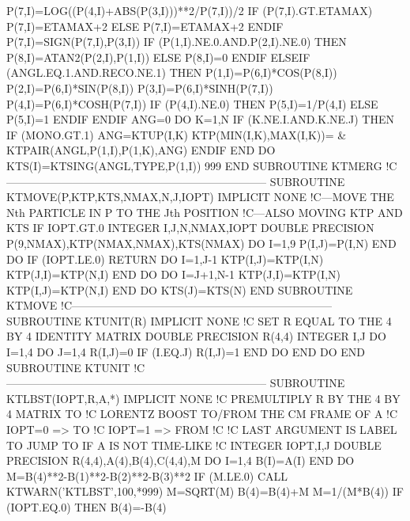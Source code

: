             P(7,I)=LOG((P(4,I)+ABS(P(3,I)))**2/P(7,I))/2
            IF (P(7,I).GT.ETAMAX) P(7,I)=ETAMAX+2
         ELSE
            P(7,I)=ETAMAX+2
         ENDIF
         P(7,I)=SIGN(P(7,I),P(3,I))
         IF (P(1,I).NE.0.AND.P(2,I).NE.0) THEN
            P(8,I)=ATAN2(P(2,I),P(1,I))
         ELSE
            P(8,I)=0
         ENDIF
      ELSEIF (ANGL.EQ.1.AND.RECO.NE.1) THEN
         P(1,I)=P(6,I)*COS(P(8,I))
         P(2,I)=P(6,I)*SIN(P(8,I))
         P(3,I)=P(6,I)*SINH(P(7,I))
         P(4,I)=P(6,I)*COSH(P(7,I))
         IF (P(4,I).NE.0) THEN
            P(5,I)=1/P(4,I)
         ELSE
            P(5,I)=1
         ENDIF
      ENDIF
      ANG=0
      DO K=1,N
         IF (K.NE.I.AND.K.NE.J) THEN
            IF (MONO.GT.1) ANG=KTUP(I,K)
            KTP(MIN(I,K),MAX(I,K))= &
                 KTPAIR(ANGL,P(1,I),P(1,K),ANG)
         ENDIF
      END DO
      KTS(I)=KTSING(ANGL,TYPE,P(1,I))
999 END SUBROUTINE KTMERG
!C-----------------------------------------------------------------------
    SUBROUTINE KTMOVE(P,KTP,KTS,NMAX,N,J,IOPT)
      IMPLICIT NONE
!C---MOVE THE Nth PARTICLE IN P TO THE Jth POSITION
!C---ALSO MOVING KTP AND KTS IF IOPT.GT.0
      INTEGER I,J,N,NMAX,IOPT
      DOUBLE PRECISION P(9,NMAX),KTP(NMAX,NMAX),KTS(NMAX)
      DO I=1,9
         P(I,J)=P(I,N)
      END DO
      IF (IOPT.LE.0) RETURN
      DO I=1,J-1
         KTP(I,J)=KTP(I,N)
         KTP(J,I)=KTP(N,I)
      END DO
      DO I=J+1,N-1
         KTP(J,I)=KTP(I,N)
         KTP(I,J)=KTP(N,I)
      END DO
      KTS(J)=KTS(N)
    END SUBROUTINE KTMOVE
!C-----------------------------------------------------------------------
\nwendcode{}\plusendmoddef
    SUBROUTINE KTUNIT(R)
      IMPLICIT NONE
!C   SET R EQUAL TO THE 4 BY 4 IDENTITY MATRIX
      DOUBLE PRECISION R(4,4)
      INTEGER I,J
      DO I=1,4
         DO J=1,4
            R(I,J)=0
            IF (I.EQ.J) R(I,J)=1
         END DO
      END DO
    END SUBROUTINE KTUNIT
!C-----------------------------------------------------------------------
    SUBROUTINE KTLBST(IOPT,R,A,*)
      IMPLICIT NONE
!C   PREMULTIPLY R BY THE 4 BY 4 MATRIX TO
!C   LORENTZ BOOST TO/FROM THE CM FRAME OF A
!C   IOPT=0 => TO
!C   IOPT=1 => FROM
!C
!C   LAST ARGUMENT IS LABEL TO JUMP TO IF A IS NOT TIME-LIKE
!C
      INTEGER IOPT,I,J
      DOUBLE PRECISION R(4,4),A(4),B(4),C(4,4),M
      DO I=1,4
         B(I)=A(I)
      END DO
      M=B(4)**2-B(1)**2-B(2)**2-B(3)**2
      IF (M.LE.0) CALL KTWARN('KTLBST',100,*999)
      M=SQRT(M)
      B(4)=B(4)+M
      M=1/(M*B(4))
      IF (IOPT.EQ.0) THEN
        B(4)=-B(4)
